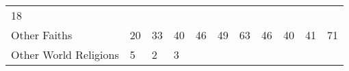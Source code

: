\documentclass[]{article}
\begin{document}
\begin{longtable}[]{@{}lllllllllll@{}}
\begin{minipage}[t]{0.11\columnwidth}
18\strut
\end{minipage}\tabularnewline
\begin{minipage}[t]{0.14\columnwidth}\raggedright\strut
Other Faiths\strut
\end{minipage} & \begin{minipage}[t]{0.04\columnwidth}\raggedright\strut
20\strut
\end{minipage} & \begin{minipage}[t]{0.05\columnwidth}\raggedright\strut
33\strut
\end{minipage} & \begin{minipage}[t]{0.05\columnwidth}\raggedright\strut
40\strut
\end{minipage} & \begin{minipage}[t]{0.05\columnwidth}\raggedright\strut
46\strut
\end{minipage} & \begin{minipage}[t]{0.05\columnwidth}\raggedright\strut
49\strut
\end{minipage} & \begin{minipage}[t]{0.05\columnwidth}\raggedright\strut
63\strut
\end{minipage} & \begin{minipage}[t]{0.06\columnwidth}\raggedright\strut
46\strut
\end{minipage} & \begin{minipage}[t]{0.06\columnwidth}\raggedright\strut
40\strut
\end{minipage} & \begin{minipage}[t]{0.04\columnwidth}\raggedright\strut
41\strut
\end{minipage} & \begin{minipage}[t]{0.11\columnwidth}\raggedright\strut
71\strut
\end{minipage}\tabularnewline
\begin{minipage}[t]{0.14\columnwidth}\raggedright\strut
Other World Religions\strut
\end{minipage} & \begin{minipage}[t]{0.04\columnwidth}\raggedright\strut
5\strut
\end{minipage} & \begin{minipage}[t]{0.05\columnwidth}\raggedright\strut
2\strut
\end{minipage} & \begin{minipage}[t]{0.05\columnwidth}\raggedright\strut
3\strut
\end{minipage} & \begin{minipage}[t]{0.05\columnwidth}\raggedright\strut

\end{minipage}
\end{longtable}
\end{document}
